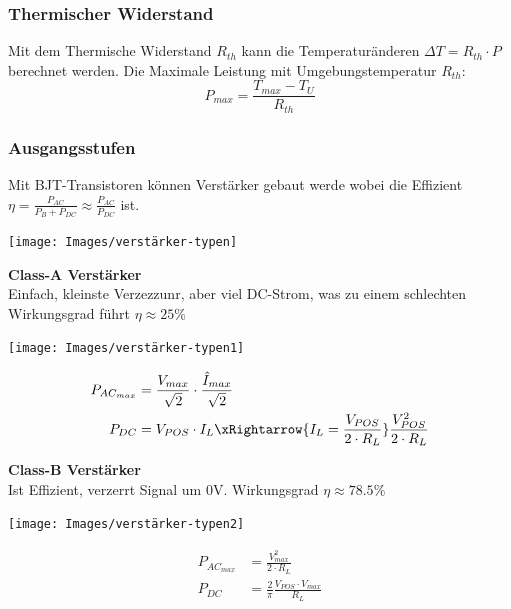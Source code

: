\subsubsection{Thermischer Widerstand}
Mit dem Thermische Widerstand $R_{th}$ kann die Temperaturänderen $\Delta T = R_{th} \cdot P$ berechnet werden. Die Maximale Leistung mit Umgebungstemperatur $R_{th}$: \[P_{max} = \frac{T_{max} - T_U}{R_{th}}\]

\subsubsection{Ausgangsstufen}
Mit BJT-Transistoren können Verstärker gebaut werde wobei die Effizient $\eta = \frac{P_{AC}}{P_B + P_{DC}} \approx \frac{P_{AC}}{P_{DC}}$ ist.
\begin{center}
	\texttt{[image: Images/verstärker-typen]}
\end{center}

\textbf{Class-A Verstärker}\\
Einfach, kleinste Verzezzunr, aber viel DC-Strom, was zu einem schlechten Wirkungsgrad führt $\eta \approx 25\%$ \\
\begin{minipage}{0.20\textwidth}
	\texttt{[image: Images/verstärker-typen1]}
\end{minipage}%
\begin{minipage}{0.30\textwidth}
	\begin{align*}
		P_{AC_{max}} &= \frac{V_{max}}{\sqrt{2}}\cdot \frac{\hat{I}_{max}}{\sqrt{2}} \\
		P_{DC} &= V_{POS} \cdot I_L \xRightarrow{I_L = \frac{V_{POS}}{2\cdot R_L}} \frac{V_{POS}^2}{2\cdot R_L}
	\end{align*}
\end{minipage}

\textbf{Class-B Verstärker}\\
Ist Effizient, verzerrt Signal um 0V. Wirkungsgrad $\eta \approx 78.5\%$\\
\begin{minipage}{0.20\textwidth}
	\texttt{[image: Images/verstärker-typen2]}
\end{minipage}%
\begin{minipage}{0.30\textwidth}
	\begin{align*}
		P_{AC_{max}} &= \frac{V_{max}^2}{2 \cdot R_L} \\
		P_{DC} &= \frac{2}{\pi}\frac{V_{POS}\cdot V_{max}}{R_L}
	\end{align*}
\end{minipage}


